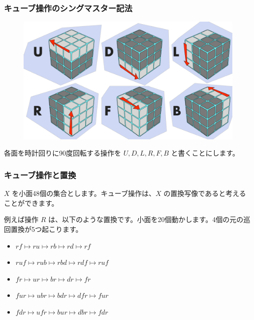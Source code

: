 \documentclass{beamer}
\begin{document}
\begin{frame}
    \frametitle{キューブ操作のシングマスター記法}

    \begin{figure}
        \includegraphics[scale=0.25]{images/singmaster.png}
    \end{figure}

    各面を時計回りに90度回転する操作を \(U, D, L, R, F, B\) と書くことにします。
\end{frame}

\begin{frame}
    \frametitle{キューブ操作と置換}

    \(X\) を小面48個の集合とします。キューブ操作は、\(X\) の置換写像であると考えることができます。

    \bigskip

    例えば操作 \(R\) は、以下のような置換です。小面を20個動かします。4個の元の巡回置換が5つ起こります。

    \begin{itemize}
        \item \(rf \mapsto ru \mapsto rb \mapsto rd \mapsto rf\)
        \item \(ruf \mapsto rub \mapsto rbd \mapsto rdf \mapsto ruf\)
        \item \(fr \mapsto ur \mapsto br \mapsto dr \mapsto fr\)
        \item \(fur \mapsto ubr \mapsto bdr \mapsto dfr \mapsto fur\)
        \item \(fdr \mapsto ufr \mapsto bur \mapsto dbr \mapsto fdr\)
    \end{itemize}
\end{frame}
\end{document}
